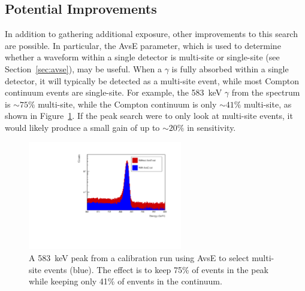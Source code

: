 \documentclass[/main.tex]{subfiles}
\begin{document}
\subsection{Potential Improvements}
In addition to gathering additional exposure, other improvements to this search are possible.
In particular, the AvsE parameter, which is used to determine whether a waveform within a single detector is multi-site or single-site (see Section~\ref{sec:avse}), may be useful.
When a $\gamma$ is fully absorbed within a single detector, it will typically be detected as a multi-site event, while most Compton continuum events are single-site.
For example, the 583~keV $\gamma$ from the  spectrum is $\sim75\%$ multi-site, while the Compton continuum is only $\sim41\%$ multi-site, as shown in Figure~\ref{fig:avse583}.
If the peak search were to only look at multi-site events, it would likely produce a small gain of up to $\sim20\%$ in sensitivity.
\begin{figure}[tb]
  \centering
  \includegraphics[width=0.6\textwidth]{avse583}
  \caption[583~keV peak with AvsE cut applied]{\label{fig:avse583}
    A 583~keV peak from a  calibration run using AvsE to select multi-site events (blue). The effect is to keep 75\% of events in the peak while keeping only 41\% of envents in the continuum.
  }
\end{figure}
\end{document}
